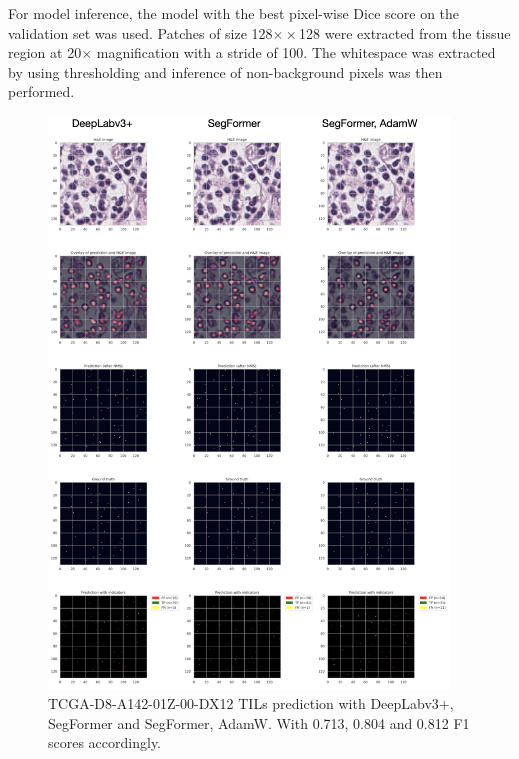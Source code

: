 For model inference, the model with the best pixel-wise Dice score on the validation set was used.
Patches of size 128$×\times$128 were extracted from the tissue region at 20$\times$ magnification
with a stride of 100. The whitespace was extracted by using thresholding and
inference of non-background pixels was then performed.

\begin{figure}[H]
    \centering
    \includegraphics[width=0.95\textwidth]{figures/tils/TCGA-D8-A142-01Z-00-DX12.png}
    \caption{TCGA-D8-A142-01Z-00-DX12 TILs prediction with DeepLabv3+, SegFormer and
    SegFormer, AdamW. With 0.713, 0.804 and 0.812 F1 scores accordingly.}
    \label{fig:TCGA-D8-A142_tils}
\end{figure}


